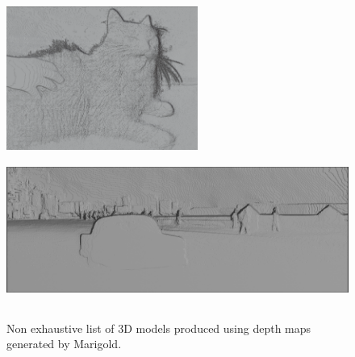 \documentclass[12pt, letterpaper]{article}
\begin{document}
\begin{figure}[!ht]
\begin{center}
        \includegraphics[height = 4.7cm]{example_5_3d}
        \includegraphics[height = 5cm]{test_image_pred_colored3d}

        \caption{Non exhaustive list of 3D models produced using depth maps generated by Marigold.}
        \label{3dmod}
    \end{center}
\end{figure}

\end{document}
